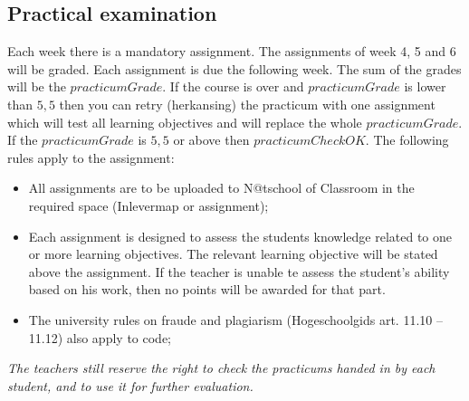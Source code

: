 \subsection{Practical examination \modulecode}
Each week there is a mandatory assignment. The assignments of week 4, 5 and 6 will be graded.
Each assignment is due the following week.
The sum of the grades will be the $practicumGrade$.
If the course is over and $practicumGrade$ is lower than $5,5$ then you can retry (herkansing) the practicum with one assignment which will test all learning objectives and will replace the whole $practicumGrade$.
If the $practicumGrade$ is $5,5$ or above then $practicumCheckOK$.
The following rules apply to the assignment:
\begin{itemize}
  \item All assignments are to be uploaded to N@tschool of Classroom in the required space (Inlevermap or assignment);
  \item Each assignment is designed to assess the students knowledge related to one or more learning objectives.
          The relevant learning objective will be stated above the assignment.
          If the teacher is unable te assess the student's ability based on his work, then no points will be awarded for that part.
  \item The university rules on fraude and plagiarism (Hogeschoolgids art. 11.10 -- 11.12) also apply to code;
\end{itemize}


\textit{The teachers still reserve the right to check the practicums handed in by each student, and to use it for further evaluation.}

